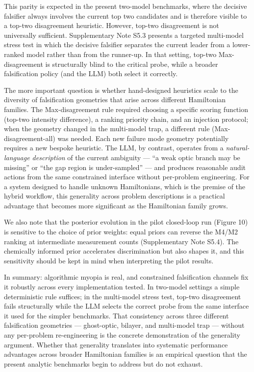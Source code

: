 \documentclass[
]{article}
\begin{document}
This parity is expected in the present two-model benchmarks, where the
decisive falsifier always involves the current top two candidates and is
therefore visible to a top-two disagreement heuristic. However, top-two
disagreement is not universally sufficient. Supplementary Note S5.3
presents a targeted multi-model stress test in which the decisive
falsifier separates the current leader from a lower-ranked model rather
than from the runner-up. In that setting, top-two Max-disagreement is
structurally blind to the critical probe, while a broader falsification
policy (and the LLM) both select it correctly.

The more important question is whether hand-designed heuristics scale to
the diversity of falsification geometries that arise across different
Hamiltonian families. The Max-disagreement rule required choosing a
specific scoring function (top-two intensity difference), a ranking
priority chain, and an injection protocol; when the geometry changed in
the multi-model trap, a different rule (Max-disagreement-all) was
needed. Each new failure mode geometry potentially requires a new
bespoke heuristic. The LLM, by contrast, operates from a
\emph{natural-language description} of the current ambiguity --- ``a
weak optic branch may be missing'' or ``the gap region is
under-sampled'' --- and produces reasonable audit actions from the same
constrained interface without per-problem engineering. For a system
designed to handle unknown Hamiltonians, which is the premise of the
hybrid workflow, this generality across problem descriptions is a
practical advantage that becomes more significant as the Hamiltonian
family grows.

We also note that the posterior evolution in the pilot closed-loop run
(Figure 10) is sensitive to the choice of prior weights: equal priors
can reverse the M4/M2 ranking at intermediate measurement counts
(Supplementary Note S5.4). The chemically informed prior accelerates
discrimination but also shapes it, and this sensitivity should be kept
in mind when interpreting the pilot results.

In summary: algorithmic myopia is real, and constrained falsification
channels fix it robustly across every implementation tested. In
two-model settings a simple deterministic rule suffices; in the
multi-model stress test, top-two disagreement fails structurally while
the LLM selects the correct probe from the same interface it used for
the simpler benchmarks. That consistency across three different
falsification geometries --- ghost-optic, bilayer, and multi-model trap
--- without any per-problem re-engineering is the concrete demonstration
of the generality argument. Whether that generality translates into
systematic performance advantages across broader Hamiltonian families is
an empirical question that the present analytic benchmarks begin to
address but do not exhaust.
\end{document}

